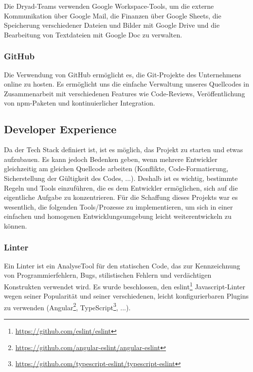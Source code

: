Die Dryad-Teams verwenden Google Workspace-Tools, um die externe Kommunikation über Google Mail, die Finanzen über Google Sheets, die Speicherung verschiedener Dateien und Bilder mit Google Drive und die Bearbeitung von Textdateien mit Google Doc zu verwalten.

\subsubsection{GitHub}

Die Verwendung von GitHub ermöglicht es, die Git-Projekte des Unternehmens online zu hosten.
Es ermöglicht uns die einfache Verwaltung unseres Quellcodes in Zusammenarbeit mit verschiedenen Features wie Code-Reviews, Veröffentlichung von npm-Paketen und kontinuierlicher Integration.

\subsection{Developer Experience}
Da der Tech Stack definiert ist, ist es möglich, das Projekt zu starten und etwas aufzubauen.
Es kann jedoch Bedenken geben, wenn mehrere Entwickler gleichzeitig am gleichen Quellcode arbeiten (Konflikte, Code-Formatierung, Sicherstellung der Gültigkeit des Codes, ...).
Deshalb ist es wichtig, bestimmte Regeln und Tools einzuführen, die es dem Entwickler ermöglichen, sich auf die eigentliche Aufgabe zu konzentrieren.
Für die Schaffung dieses Projekts war es wesentlich, die folgenden Tools/Prozesse zu implementieren, um sich in einer einfachen und homogenen Entwicklungsumgebung leicht weiterentwickeln zu können.

\subsubsection{Linter}
Ein Linter ist ein AnalyseTool für den statischen Code, das zur Kennzeichnung von Programmierfehlern, Bugs, stilistischen Fehlern und verdächtigen Konstrukten verwendet wird.
Es wurde beschlossen, den eslint\footnote{\href{https://github.com/eslint/eslint}{https://github.com/eslint/eslint}} Javascript-Linter wegen seiner Popularität und seiner verschiedenen, leicht konfigurierbaren Plugins zu verwenden (Angular\footnote{\href{https://github.com/angular-eslint/angular-eslint}{https://github.com/angular-eslint/angular-eslint}}, TypeScript\footnote{\href{https://github.com/typescript-eslint/typescript-eslint}{https://github.com/typescript-eslint/typescript-eslint}}, ...).

